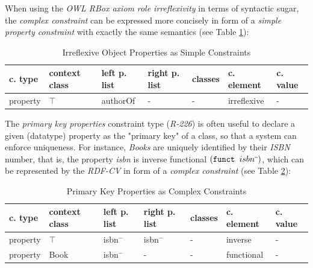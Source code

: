 \documentclass[a4paper,fontsize=11pt]{scrartcl}
\newcommand{\ms}[1]{\texttt{#1}}
\begin{document}
When using the \emph{OWL RBox axiom} \emph{role irreflexivity} in terms of syntactic sugar, 
the \emph{complex constraint} can be expressed more concisely in form of a \emph{simple property constraint} with exactly the same semantics (see Table \ref{tab:irreflexive-object-properties-as-simple-constraints}):


\begin{table}
  \scriptsize
  \sffamily
  \vspace{0cm}
	\caption{Irreflexive Object Properties as Simple Constraints}
	\label{tab:irreflexive-object-properties-as-simple-constraints}
	\centering
		\begin{tabular}{l|l|l|l|l|l|l}
      \textbf{c. type} & \textbf{context class} & \textbf{left p. list} & \textbf{right p. list} & \textbf{classes} & \textbf{c. element} & \textbf{c. value} \\
      \hline
property & $\top$ & authorOf & - & - & irreflexive & - \\
		\end{tabular}
\end{table}

The \emph{primary key properties} constraint type (\emph{R-226}) is often useful to declare a given (datatype) property as the "primary key" of a class, so that a system can enforce uniqueness. 
For instance, \emph{Books} are uniquely identified by their \emph{ISBN} number, that is, the property \emph{isbn} is inverse functional \ms{$(\ms{funct } isbn\sp{\overline{\ }})$}, 
which can be represented by the \emph{RDF-CV} in form of a \emph{complex constraint} (see Table \ref{tab:primary-key-properties-as-complex-constraints}):


\begin{table}
  \scriptsize
  \sffamily
  \vspace{0cm}
	\caption{Primary Key Properties as Complex Constraints}
	\label{tab:primary-key-properties-as-complex-constraints}
	\centering
		\begin{tabular}{l|l|l|l|l|l|l}
      \textbf{c. type} & \textbf{context class} & \textbf{left p. list} & \textbf{right p. list} & \textbf{classes} & \textbf{c. element} & \textbf{c. value} \\
      \hline
property & $\top$ & isbn$^{-}$ & isbn$^{-}$ & - & inverse & - \\
property & Book & isbn$^{-}$ & - & - & functional & - \\
		\end{tabular}
\end{table}
\end{document}
